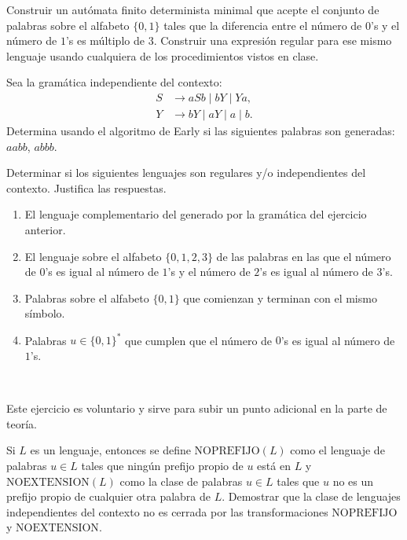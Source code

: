 \documentclass[12pt]{article}
\begin{document}
    \begin{ejercicio}[2.5 puntos]
        Construir un autómata finito determinista minimal que acepte el conjunto de palabras sobre el alfabeto $\{0, 1\}$ tales que la diferencia entre el número de $0$'s y el número de $1$'s es múltiplo de $3$. Construir una expresión regular para ese mismo lenguaje usando cualquiera de los procedimientos vistos en clase.
    \end{ejercicio}

    \begin{ejercicio}[2.5 puntos]
        Sea la gramática independiente del contexto:
        \[
            \begin{aligned}
                S &\to aSb \mid bY \mid Ya, \\
                Y &\to bY \mid aY \mid a \mid b.
            \end{aligned}
        \]
        Determina usando el algoritmo de Early si las siguientes palabras son generadas: $aabb$, $abbb$.
    \end{ejercicio}

    \begin{ejercicio}[2.5 puntos]
        Determinar si los siguientes lenguajes son regulares y/o independientes del contexto. Justifica las respuestas.
        \begin{enumerate}
            \item El lenguaje complementario del generado por la gramática del ejercicio anterior.
            \item El lenguaje sobre el alfabeto $\{0, 1, 2, 3\}$ de las palabras en las que el número de $0$'s es igual al número de $1$'s y el número de $2$'s es igual al número de $3$'s.
            \item Palabras sobre el alfabeto $\{0, 1\}$ que comienzan y terminan con el mismo símbolo.
            \item Palabras $u \in \{0, 1\}^*$ que cumplen que el número de $0$'s es igual al número de $1$'s.
        \end{enumerate}
    \end{ejercicio}

    \begin{ejercicio}[1 punto]~
        \begin{observacion}
            Este ejercicio es voluntario y sirve para subir un punto adicional en la parte de teoría.
        \end{observacion}
        Si $L$ es un lenguaje, entonces se define $\text{NOPREFIJO}(L)$ como el lenguaje de palabras $u \in L$ tales que ningún prefijo propio de $u$ está en $L$ y $\text{NOEXTENSION}(L)$ como la clase de palabras $u \in L$ tales que $u$ no es un prefijo propio de cualquier otra palabra de $L$. Demostrar que la clase de lenguajes independientes del contexto no es cerrada por las transformaciones $\text{NOPREFIJO}$ y $\text{NOEXTENSION}$.
    \end{ejercicio}
\end{document}
